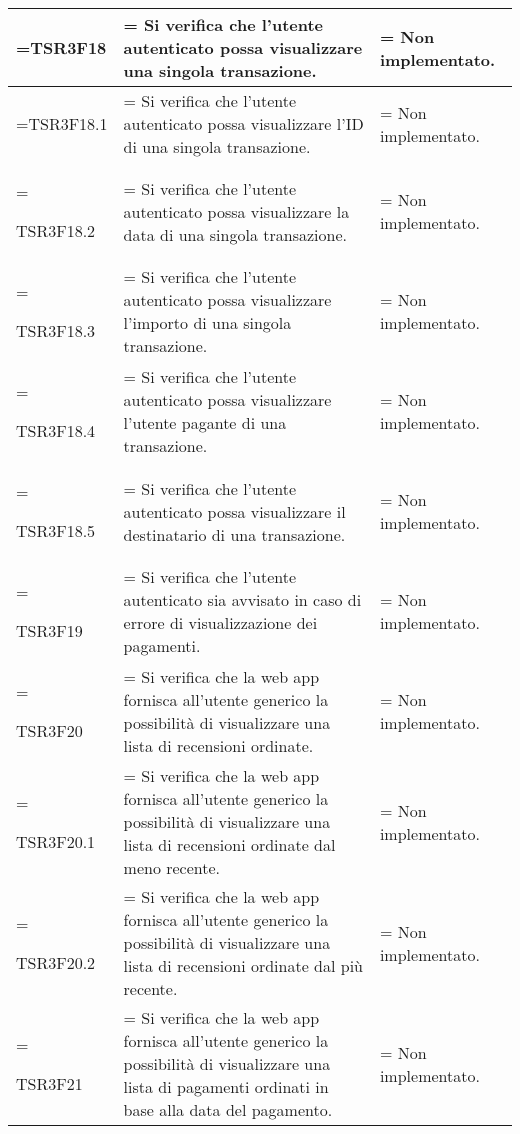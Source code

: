 \begin{xltabular}{\textwidth} {
            >{\hsize\linewidth=\hsize}X
            >{\hsize\linewidth=\hsize}X
            >{\hsize\linewidth=\hsize}X
        }
        TSR3F18 &
        Si verifica che l'utente autenticato possa visualizzare una singola transazione. &
        Non implementato.
        \\ \hline

        TSR3F18.1 &
        Si verifica che l'utente autenticato possa visualizzare l'ID di una singola transazione. &
        Non implementato.
        \\ \hline


        TSR3F18.2 &
        Si verifica che l'utente autenticato possa visualizzare la data di una singola transazione. &
        Non implementato.
        \\ \hline

        TSR3F18.3 &
        Si verifica che l'utente autenticato possa visualizzare l'importo di una singola transazione. &
        Non implementato.
        \\ \hline

        TSR3F18.4 &
        Si verifica che l'utente autenticato possa visualizzare l'utente pagante di una transazione. &
        Non implementato.
        \\ \hline

        TSR3F18.5 &
        Si verifica che l'utente autenticato possa visualizzare il destinatario di una transazione. &
        Non implementato.
        \\ \hline

        TSR3F19 &
        Si verifica che l'utente autenticato sia avvisato in caso di errore di visualizzazione dei pagamenti. &
        Non implementato.
        \\ \hline

        TSR3F20 &
        Si verifica che la web app fornisca all'utente generico la possibilità di visualizzare una lista di recensioni ordinate. &
        Non implementato. 
        \\ \hline

        TSR3F20.1 &
        Si verifica che la web app fornisca all'utente generico la possibilità di visualizzare una lista di recensioni ordinate dal meno recente. &
        Non implementato. 
        \\ \hline

        TSR3F20.2 &
        Si verifica che la web app fornisca all'utente generico la possibilità di visualizzare una lista di recensioni ordinate dal più recente. &
        Non implementato. 
        \\ \hline

        TSR3F21 &
        Si verifica che la web app fornisca all'utente generico la possibilità di visualizzare una lista di pagamenti ordinati in base alla data del pagamento. &
        Non implementato. 
        \\ \hline


\end{xltabular}
